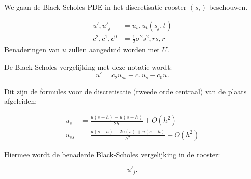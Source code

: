 \documentclass{article}
\begin{document}

We gaan de Black-Scholes PDE in het
discretisatie rooster $(s_{i})$ beschouwen.\\

\begin{notatie}
  \begin{align*}
    u',u'_{j}   &= u_{t},u_{t}(s_{j},t)\\
    c^{2},c^{1},c^{0}&= \frac{1}{2} \sigma^{2}s^{2}, rs , r  
  \end{align*}
 Benaderingen van $u$ zullen aangeduid worden met
 $U$.
\end{notatie}

De Black-Scholes vergelijking met deze notatie wordt:
\[
  u'= c_{2}u_{ss }+ c_{1}u_{s} -c_{0}u
.\]

Dit zijn de formules voor de discretisatie 
(tweede orde centraal) van de plaats
afgeleiden:

\begin{align*}
  u_{s}  &= \frac{u(s+h)-u(s-h)}{2h} + O(h^{2})\\
  u_{ss} &= \frac{u(s+h)-2u(s)+u(s-h)}{h^{2}} + O(h^{2})
\end{align*}

Hiermee wordt de benaderde Black-Scholes vergelijking
in de rooster:

\[
  u'_{j}
.\]
\end{document}
